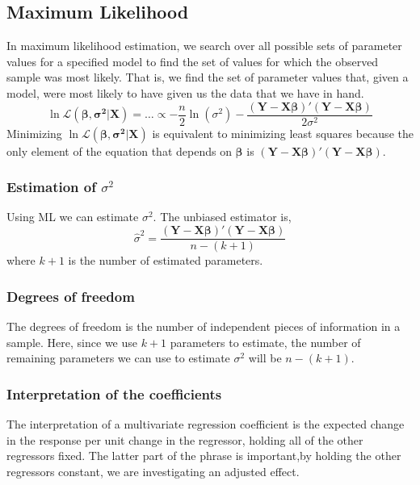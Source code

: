 
\subsection{Maximum Likelihood}
In maximum likelihood estimation, we search over all possible sets of parameter
values for a specified model to find the set of values for which the observed
sample was most likely. That is, we find the set of parameter values that, given
a model, were most likely to have given us the data that we have in hand.
\begin{equation}
    \ln \mathcal{L}(\bm{\beta, \sigma^2|X}) = \dots \propto -\frac{n}{2}\ln(\sigma^2)-\frac{\bm{(Y-X\beta)'(Y-X\beta)}}{2\sigma^2}
\end{equation}
Minimizing $\ln \mathcal{L}(\bm{\beta, \sigma^2|X})$ is equivalent to minimizing
least squares because the only element of the equation that depends on $\bm{\beta}$
is $\bm{(Y-X\beta)'(Y-X\beta)}$.

\subsubsection{Estimation of $\sigma^2$}
Using ML we can estimate $\sigma^2$. The unbiased estimator is,
\begin{equation}
    \hat{\sigma}^2 = \frac{\bm{(Y-X\beta)'(Y-X\beta)}}{n-(k+1)}
\end{equation}
where $k+1$ is the number of estimated parameters.

\subsubsection{Degrees of freedom}
The degrees of freedom is the number of independent pieces of information in a sample. Here,
since we use $k+1$ parameters to estimate, the number of remaining parameters we can use
to estimate $\sigma^2$ will be $n-(k+1)$.

\subsubsection{Interpretation of the coefficients}
The interpretation of a multivariate regression coefficient is the expected
change in the response per unit change in the regressor, holding all of the other
regressors fixed. The latter part of the phrase is important,by holding the
other regressors constant, we are investigating an adjusted effect.

